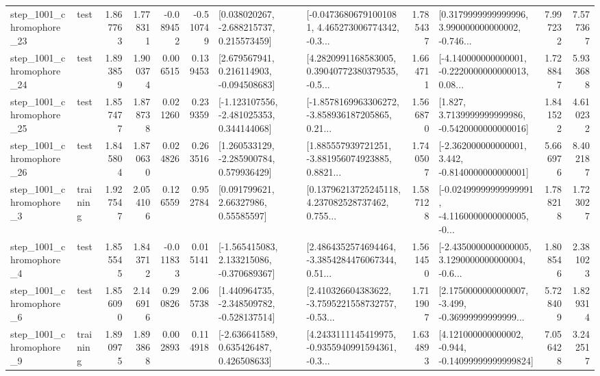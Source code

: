 \begin{tabular}{llrrrrllrlrr}
 step\_1001\_chromophore\_23 &      test &      1.867763 &    1.778311 &     -0.089452 & -0.510749 &    [0.038020267, -2.688215737, 0.215573459] &  [-0.04736806791001081, 4.465273006774342, -0.3... &       1.785437 &  [0.3179999999999996, 3.990000000000002, -0.746... &            7.997232 &          7.577367 \\
 step\_1001\_chromophore\_24 &      test &      1.893859 &    1.900374 &      0.006515 &  0.139453 &    [2.679567941, 0.216114903, -0.094508683] &  [4.2820991168583005, 0.39040772380379535, -0.5... &       1.664711 &  [-4.140000000000001, -0.2220000000000013, 0.08... &            1.728847 &          5.933688 \\
 step\_1001\_chromophore\_25 &      test &      1.857477 &    1.878738 &      0.021260 &  0.239359 &   [-1.123107556, -2.481025353, 0.344144068] &  [-1.8578169963306272, -3.858936187205865, 0.21... &       1.566870 &   [1.827, 3.7139999999999986, -0.5420000000000016] &            1.841522 &          4.610232 \\
 step\_1001\_chromophore\_26 &      test &      1.845804 &    1.870630 &      0.024826 &  0.263516 &    [1.260533129, -2.285900784, 0.579936429] &  [1.885557939721251, -3.881956074923885, 0.8821... &       1.740507 &   [-2.362000000000001, 3.442, -0.8140000000000001] &            5.666976 &          8.402187 \\
  step\_1001\_chromophore\_3 &  training &      1.927547 &    2.054106 &      0.126559 &  0.952784 &       [0.091799621, 2.66327986, 0.55585597] &  [0.13796213725245118, 4.237082528737462, 0.755... &       1.587128 &  [-0.02499999999999991, -4.1160000000000005, -0... &            1.788218 &          1.723027 \\
  step\_1001\_chromophore\_4 &      test &      1.855545 &    1.843712 &     -0.011833 &  0.015141 &   [-1.565415083, 2.133215086, -0.370689367] &  [2.4864352574694464, -3.3854284476067344, 0.51... &       1.561450 &  [-2.4350000000000005, 3.1290000000000004, -0.6... &            1.808546 &          2.381023 \\
  step\_1001\_chromophore\_6 &      test &      1.856090 &    2.146916 &      0.290826 &  2.065738 &   [1.440964735, -2.348509782, -0.528137514] &  [2.410326604383622, -3.7595221558732757, -0.53... &       1.711907 &  [2.1750000000000007, -3.499, -0.36999999999999... &            5.728409 &          1.829314 \\
  step\_1001\_chromophore\_9 &  training &      1.890975 &    1.893868 &      0.002893 &  0.114918 &    [-2.636641589, 0.635426487, 0.426508633] &  [4.2433111145419975, -0.9355940991594361, -0.3... &       1.634893 &  [4.121000000000002, -0.944, -0.14099999999999824] &            7.056428 &          3.242517 \\

\end{tabular}
